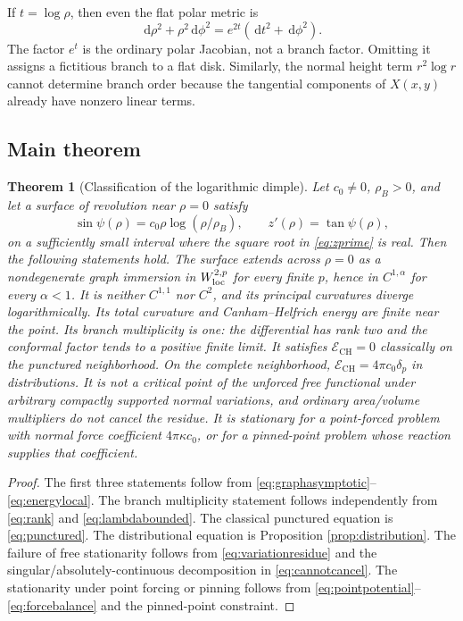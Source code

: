 \documentclass[preprint,amsmath,amssymb,aps,prl,superscriptaddress,nofootinbib,floatfix]{revtex4-2}
\newtheorem{theorem}{Theorem}[section]
\newcommand{\dd}{\,\mathrm d}
\newcommand{\E}{\mathcal E}
\newcommand{\CH}{\mathrm{CH}}
\begin{document}
If \(t=\log\rho\), then even the flat polar metric is
\[
\dd\rho^2+\rho^2\dd\phi^2=e^{2t}(\dd t^2+\dd\phi^2).
\]
The factor \(e^t\) is the ordinary polar Jacobian, not a branch factor. Omitting it assigns a fictitious branch to a flat disk. Similarly, the normal height term \(r^2\log r\) cannot determine branch order because the tangential components of \(X(x,y)\) already have nonzero linear terms.

\subsection{Main theorem}\label{sec:maintheorem}
\begin{theorem}[Classification of the logarithmic dimple]\label{thm:main}
Let \(c_0\ne0\), \(\rho_B>0\), and let a surface of revolution near \(\rho=0\) satisfy
\[
\sin\psi(\rho)=c_0\rho\log(\rho/\rho_B),\qquad z'(\rho)=\tan\psi(\rho),
\]
on a sufficiently small interval where the square root in \eqref{eq:zprime} is real. Then the following statements hold. The surface extends across \(\rho=0\) as a nondegenerate graph immersion in \(W^{2,p}_{\rm loc}\) for every finite \(p\), hence in \(C^{1,\alpha}\) for every \(\alpha<1\). It is neither \(C^{1,1}\) nor \(C^2\), and its principal curvatures diverge logarithmically. Its total curvature and Canham--Helfrich energy are finite near the point. Its branch multiplicity is one: the differential has rank two and the conformal factor tends to a positive finite limit. It satisfies \(\E_{\CH}=0\) classically on the punctured neighborhood. On the complete neighborhood, \(\E_{\CH}=4\pi c_0\delta_p\) in distributions. It is not a critical point of the unforced free functional under arbitrary compactly supported normal variations, and ordinary area/volume multipliers do not cancel the residue. It is stationary for a point-forced problem with normal force coefficient \(4\pi\kappa c_0\), or for a pinned-point problem whose reaction supplies that coefficient.
\end{theorem}
\begin{proof}
The first three statements follow from \eqref{eq:graphasymptotic}--\eqref{eq:energylocal}. The branch multiplicity statement follows independently from \eqref{eq:rank} and \eqref{eq:lambdabounded}. The classical punctured equation is \eqref{eq:punctured}. The distributional equation is Proposition \ref{prop:distribution}. The failure of free stationarity follows from \eqref{eq:variationresidue} and the singular/absolutely-continuous decomposition in \eqref{eq:cannotcancel}. The stationarity under point forcing or pinning follows from \eqref{eq:pointpotential}--\eqref{eq:forcebalance} and the pinned-point constraint.
\end{proof}
\end{document}
